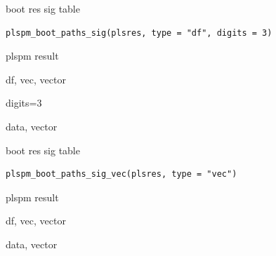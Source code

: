 \documentclass[a4paper]{book}
\begin{document}
%
\begin{Description}
boot res sig table
\end{Description}
%
\begin{Usage}
\begin{verbatim}
plspm_boot_paths_sig(plsres, type = "df", digits = 3)
\end{verbatim}
\end{Usage}
%
\begin{Arguments}
\begin{ldescription}
\item[\code{plsres}] plspm result

\item[\code{type}] df, vec, vector

\item[\code{digits}] digits=3
\end{ldescription}
\end{Arguments}
%
\begin{Value}
data, vector
\end{Value}

%
\begin{Description}
boot res sig table
\end{Description}
%
\begin{Usage}
\begin{verbatim}
plspm_boot_paths_sig_vec(plsres, type = "vec")
\end{verbatim}
\end{Usage}
%
\begin{Arguments}
\begin{ldescription}
\item[\code{plsres}] plspm result

\item[\code{type}] df, vec, vector
\end{ldescription}
\end{Arguments}
%
\begin{Value}
data, vector
\end{Value}
\end{document}
